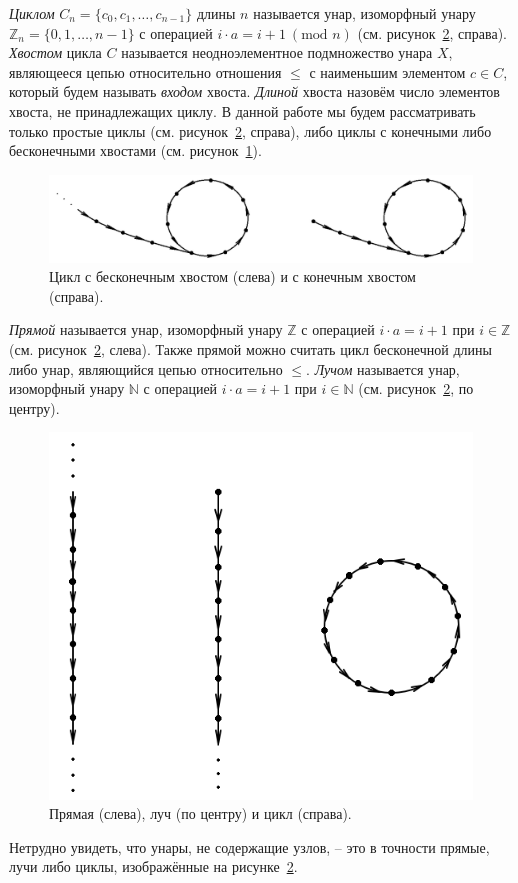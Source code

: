 \documentclass[11pt,twoside,final
]{article}
\begin{document}
\textit{Циклом} $C_n = \{ c_0, c_1, \ldots, c_{n - 1} \}$ длины $n$ называется унар, изоморфный унару $\mathbb{Z}_n = \{ 0, 1, \ldots, n - 1 \}$ с операцией $i \cdot a = i + 1 \ (\textrm{mod } n)$ (см. рисунок~\ref{fig:line_ray_cycle}, справа).
\textit{Хвостом} цикла $C$ называется неодноэлементное подмножество унара $X$, являющееся цепью относительно отношения $\leqslant$ с наименьшим элементом $c \in C$, который будем называть \textit{входом} хвоста.
\textit{Длиной} хвоста назовём число элементов хвоста, не принадлежащих циклу.
В данной работе мы будем рассматривать только простые циклы (см. рисунок~\ref{fig:line_ray_cycle}, справа), либо циклы с конечными либо бесконечными хвостами (см. рисунок~\ref{fig:tails}).
\begin{figure}[ht!]
	\centering
	\includegraphics[scale=0.4]{img/tails.png}
	\caption{Цикл с бесконечным хвостом (слева) и с конечным хвостом (справа).}
	\label{fig:tails}
\end{figure}
\textit{Прямой} называется унар, изоморфный унару $\mathbb{Z}$ с операцией $i \cdot a = i + 1$ при $i \in \mathbb{Z}$ (см. рисунок~\ref{fig:line_ray_cycle}, слева).
Также прямой можно считать цикл бесконечной длины либо унар, являющийся цепью относительно $\leqslant$.
\textit{Лучом} называется унар, изоморфный унару $\mathbb{N}$ с операцией $i \cdot a = i + 1$ при $i \in \mathbb{N}$ (см. рисунок~\ref{fig:line_ray_cycle}, по центру).
\begin{figure}[ht!]
	\centering
	\includegraphics[scale=0.5]{img/line_ray_cycle.png}
	\caption{Прямая (слева), луч (по центру) и цикл (справа).}
	\label{fig:line_ray_cycle}
\end{figure}
Нетрудно увидеть, что унары, не содержащие узлов, -- это в точности прямые, лучи либо циклы, изображённые на рисунке~\ref{fig:line_ray_cycle}.
\end{document}
